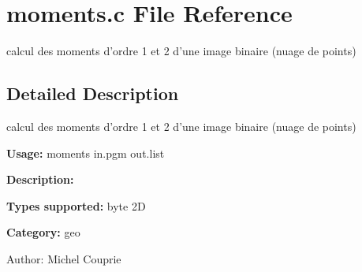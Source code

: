 \section{moments.c File Reference}
\label{moments_8c}
calcul des moments d'ordre 1 et 2 d'une image binaire (nuage de points) 



\subsection{Detailed Description}
calcul des moments d'ordre 1 et 2 d'une image binaire (nuage de points) 

{\bf Usage:} moments in.pgm out.list

{\bf Description:}

{\bf Types supported:} byte 2D

{\bf Category:} geo

\begin{Desc}
\item[Author:]Michel Couprie \end{Desc}
